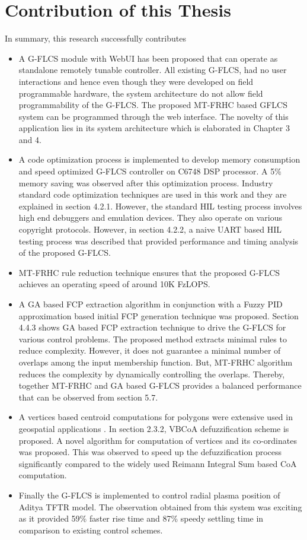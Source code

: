 \section{Contribution of this Thesis}
In summary, this research successfully contributes  
\begin{itemize}
	\item A G-FLCS module with WebUI has been proposed that can operate as standalone remotely tunable controller. All existing G-FLCS, had no user interactions \cite{Millan2008,Fu2010} and hence even though they were developed on field programmable hardware, the system architecture do not allow field programmability of the G-FLCS. The proposed MT-FRHC based GFLCS system can be programmed through the web interface. The novelty of this application lies in its system architecture which is elaborated in Chapter 3 and 4.
	\item A code optimization process is implemented to develop memory consumption and speed optimized G-FLCS controller on C6748 DSP processor. A 5\% memory saving was observed after this optimization process. Industry standard code optimization techniques are used in this work and they are explained in section 4.2.1. However, the standard HIL testing process involves high end debuggers and emulation devices. They also operate on various copyright protocols. However, in section 4.2.2, a naive UART based HIL testing process was described that provided performance and timing analysis of the proposed G-FLCS.   
	\item MT-FRHC rule reduction technique ensures that the proposed G-FLCS achieves an operating speed of around 10K FzLOPS.
	\item A GA based FCP extraction algorithm in conjunction with a Fuzzy PID approximation based initial FCP generation technique was proposed. Section 4.4.3 shows GA based FCP extraction technique to drive the G-FLCS for various control problems. The proposed method extracts minimal rules to reduce complexity. However, it does not guarantee a minimal number of overlaps among the input membership function. But, MT-FRHC algorithm reduces the complexity by dynamically controlling the overlaps. Thereby, together MT-FRHC and GA based G-FLCS provides a balanced performance that can be observed from section 5.7.
	\item A vertices based centroid computations for polygons were extensive used in geospatial applications \cite{Stankute2010}. In section 2.3.2, VBCoA defuzzification scheme is proposed. A novel algorithm for computation of vertices and its co-ordinates was proposed. This was observed to speed up the defuzzification process significantly compared to the widely used Reimann Integral Sum based CoA computation.
	\item Finally the G-FLCS is implemented to control radial plasma position of Aditya TFTR model. The observation obtained from this system was exciting as it provided 59\% faster rise time and 87\% speedy settling time in comparison to existing control schemes.
\end{itemize}



